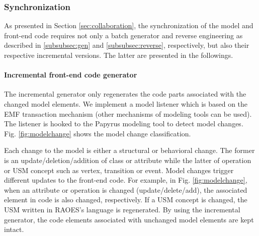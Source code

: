 \noindent
\subsubsection{Synchronization}
As presented in Section \ref{sec:collaboration}, the synchronization of the model and front-end code requires not only a batch generator and reverse engineering as described in \ref{subsubsec:gen} and \ref{subsubsec:reverse}, respectively, but also their respective incremental versions.
The latter are presented in the followings.
 
\noindent
\paragraph{Incremental front-end code generator}
The incremental generator only regenerates the code parts associated with the changed model elements.
We implement a model listener which is based on the EMF transaction mechanism (other mechanisms of modeling tools can be used).
The listener is hooked to the Papyrus modeling tool to detect model changes.
Fig. \ref{fig:modelchange} shows the model change classification. 

Each change to the model is either a structural or behavioral change.
The former is an update/deletion/addition of class or attribute while the latter of operation or USM concept such as vertex, transition or event. 
Model changes trigger different updates to the front-end code.
For example, in Fig. \ref{fig:modelchange}, when an attribute or operation is changed (update/delete/add), the associated element in code is also changed, respectively.
If a USM concept is changed, the USM written in RAOES's language is regenerated.
By using the incremental generator, the code elements associated with unchanged model elements are kept intact.


